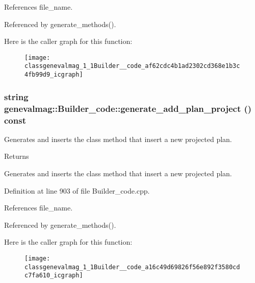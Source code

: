 References file\_\-name.



Referenced by generate\_\-methods().



Here is the caller graph for this function:\nopagebreak
\begin{figure}[H]
\begin{center}
\leavevmode
\texttt{[image: classgenevalmag\_1\_1Builder\_\_code\_af62cdc4b1ad2302cd368e1b3c4fb99d9\_icgraph]}
\end{center}
\end{figure}


\hypertarget{classgenevalmag_1_1Builder__code_a16c49d69826f56e892f3580cdc7fa610}{
\subsubsection[{generate\_\-add\_\-plan\_\-project}]{\setlength{\rightskip}{0pt plus 5cm}string genevalmag::Builder\_\-code::generate\_\-add\_\-plan\_\-project () const}}
\label{classgenevalmag_1_1Builder__code_a16c49d69826f56e892f3580cdc7fa610}
Generates and inserts the class method that insert a new projected plan. \begin{DoxyReturn}{Returns}

\end{DoxyReturn}
Generates and inserts the class method that insert a new projected plan. 

Definition at line 903 of file Builder\_\-code.cpp.



References file\_\-name.



Referenced by generate\_\-methods().



Here is the caller graph for this function:\nopagebreak
\begin{figure}[H]
\begin{center}
\leavevmode
\texttt{[image: classgenevalmag\_1\_1Builder\_\_code\_a16c49d69826f56e892f3580cdc7fa610\_icgraph]}
\end{center}
\end{figure}


